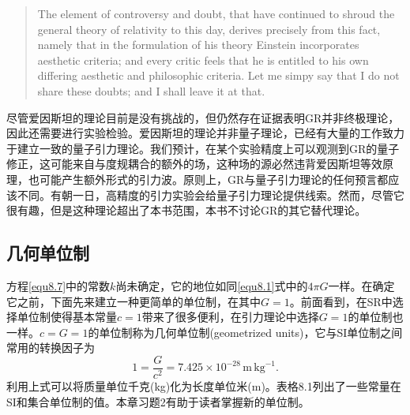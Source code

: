 \begin{quote}
The element of controversy and doubt, that have continued to shroud the general theory of relativity to this day, derives precisely from this fact, namely that in the formulation of his theory Einstein incorporates aesthetic criteria; and every critic feels that he is entitled to his own differing aesthetic and philosophic criteria. Let me simpy say that I do not share these doubts; and I shall leave it at that.
\end{quote}

尽管爱因斯坦的理论目前是没有挑战的，但仍然存在证据表明GR并非终极理论，因此还需要进行实验检验。爱因斯坦的理论并非量子理论，已经有大量的工作致力于建立一致的量子引力理论。我们预计，在某个实验精度上可以观测到GR的量子修正，这可能来自与度规耦合的额外的场，这种场的源必然违背爱因斯坦等效原理，也可能产生额外形式的引力波。原则上，GR与量子引力理论的任何预言都应该不同。有朝一日，高精度的引力实验会给量子引力理论提供线索。然而，尽管它很有趣，但是这种理论超出了本书范围，本书不讨论GR的其它替代理论。

\subsection*{几何单位制}
方程\eqref{equ8.7}中的常数$k$尚未确定，它的地位如同\eqref{equ8.1}式中的$4 \pi G$一样。在确定它之前，下面先来建立一种更简单的单位制，在其中$G = 1$。前面看到，在SR中选择单位制使得基本常量$c = 1$带来了很多便利，在引力理论中选择$G = 1$的单位制也一样。$c = G = 1$的单位制称为几何单位制(geometrized units)，它与SI单位制之间常用的转换因子为
\begin{equation}
    1 = \frac{G}{c^2} = 7.425 \times 10^{-28}\, \mathrm{m}\, \mathrm{kg}^{-1}.
\label{equ8.9}
\end{equation}
利用上式可以将质量单位千克(kg)化为长度单位米(m)。表格8.1列出了一些常量在SI和集合单位制的值。本章习题2有助于读者掌握新的单位制。


